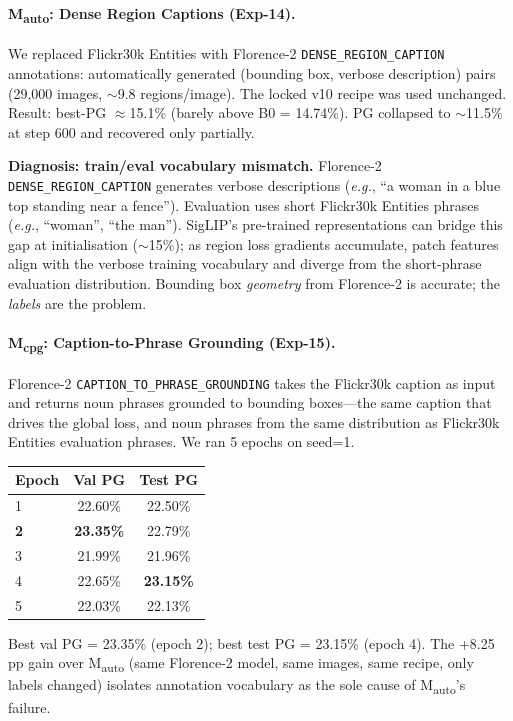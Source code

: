 \documentclass{article}
\newcommand{\eg}{\textit{e.g.}}
\begin{document}
\paragraph{M\textsubscript{auto}: Dense Region Captions (Exp-14).}
We replaced Flickr30k Entities with Florence-2 \texttt{DENSE\_REGION\_CAPTION}
annotations: automatically generated (bounding box, verbose description) pairs
(29,000 images, $\sim$9.8 regions/image). The locked v10 recipe was used
unchanged. Result: best-PG $\approx$15.1\% (barely above B0 = 14.74\%). PG
collapsed to $\sim$11.5\% at step 600 and recovered only partially.

\textbf{Diagnosis: train/eval vocabulary mismatch.} Florence-2
\texttt{DENSE\_REGION\_CAPTION} generates verbose descriptions
(\eg, ``a woman in a blue top standing near a fence''). Evaluation uses short
Flickr30k Entities phrases (\eg, ``woman'', ``the man''). SigLIP's
pre-trained representations can bridge this gap at initialisation ($\sim$15\%);
as region loss gradients accumulate, patch features align with the verbose
training vocabulary and diverge from the short-phrase evaluation distribution.
Bounding box \emph{geometry} from Florence-2 is accurate; the \emph{labels}
are the problem.

\paragraph{M\textsubscript{cpg}: Caption-to-Phrase Grounding (Exp-15).}
Florence-2 \texttt{CAPTION\_TO\_PHRASE\_GROUNDING} takes the Flickr30k caption
as input and returns noun phrases grounded to bounding boxes---the same caption
that drives the global loss, and noun phrases from the same distribution as
Flickr30k Entities evaluation phrases. We ran 5 epochs on seed=1.

\begin{center}
\begin{tabular}{lcc}
\toprule
Epoch & Val PG & Test PG \\
\midrule
1 & 22.60\% & 22.50\% \\
\textbf{2} & \textbf{23.35\%} & 22.79\% \\
3 & 21.99\% & 21.96\% \\
4 & 22.65\% & \textbf{23.15\%} \\
5 & 22.03\% & 22.13\% \\
\bottomrule
\end{tabular}
\end{center}

Best val PG = 23.35\% (epoch 2); best test PG = 23.15\% (epoch 4).
The +8.25 pp gain over M\textsubscript{auto} (same Florence-2 model, same
images, same recipe, only labels changed) isolates annotation vocabulary as the
sole cause of M\textsubscript{auto}'s failure.
\end{document}
